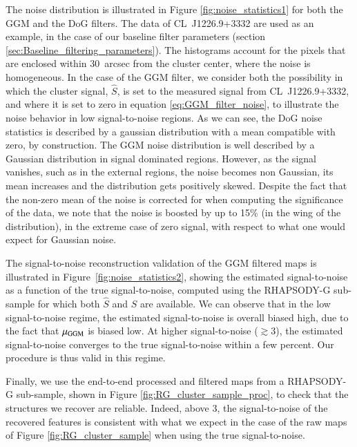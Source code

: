 \documentclass[twocolumn,traditabstract]{aa}
\begin{document}
The noise distribution is illustrated in Figure \ref{fig:noise_statistics1} for both the GGM and the DoG filters. The data of \mbox{CL~J1226.9+3332} are used as an example, in the case of our baseline filter parameters (section \ref{sec:Baseline_filtering_parameters}). The histograms account for the pixels that are enclosed within 30~arcsec from the cluster center, where the noise is homogeneous. In the case of the GGM filter, we consider both the possibility in which the cluster signal, $\hat{S}$, is set to the measured signal from \mbox{CL~J1226.9+3332}, and where it is set to zero in equation \ref{eq:GGM_filter_noise}, to illustrate the noise behavior in low signal-to-noise regions. As we can see, the DoG noise statistics is described by a gaussian distribution with a mean compatible with zero, by construction. The GGM noise distribution is well described by a Gaussian distribution in signal dominated regions. However, as the signal vanishes, such as in the external regions, the noise becomes non Gaussian, its mean increases and the distribution gets positively skewed. Despite the fact that the non-zero mean of the noise is corrected for when computing the significance of the data, we note that the noise is boosted by up to 15\% (in the wing of the distribution), in the extreme case of zero signal, with respect to what one would expect for Gaussian noise.

The signal-to-noise reconstruction validation of the GGM filtered maps is illustrated in Figure~\ref{fig:noise_statistics2}, showing the estimated signal-to-noise as a function of the true signal-to-noise, computed using the RHAPSODY-G sub-sample for which both $\hat{S}$ and $S$ are available. We can observe that in the low signal-to-noise regime, the estimated signal-to-noise is overall biased high, due to the fact that $\mu_{\rm GGM}$ is biased low. At higher signal-to-noise ($\gtrsim 3$), the estimated signal-to-noise converges to the true signal-to-noise within a few percent. Our procedure is thus valid in this regime.

Finally, we use the end-to-end processed and filtered maps from a RHAPSODY-G sub-sample, shown in Figure \ref{fig:RG_cluster_sample_proc}, to check that the structures we recover are reliable. Indeed, above 3, the signal-to-noise of the recovered features is consistent with what we expect in the case of the raw maps of Figure \ref{fig:RG_cluster_sample} when using the true signal-to-noise.
\end{document}
